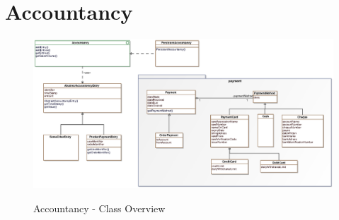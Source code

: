 \section{Accountancy}

\begin{figure}[ht]
	\centering
  \includegraphics[width=1.0\textwidth]{images/Accountancy_Overview.eps}
	\label{accountancy_overview}
	\caption{Accountancy - Class Overview}
\end{figure}
